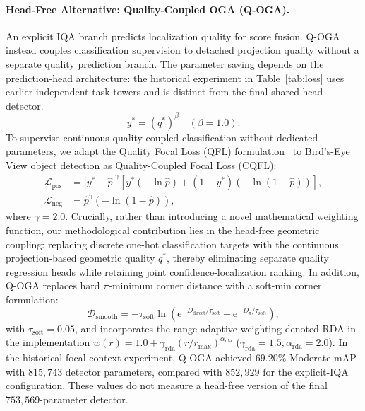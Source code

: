 \paragraph{Head-Free Alternative: Quality-Coupled OGA (Q-OGA).}
An explicit IQA branch predicts localization quality for score fusion. Q-OGA instead couples classification supervision to detached projection quality without a separate quality prediction branch. The parameter saving depends on the prediction-head architecture: the historical experiment in Table~\ref{tab:loss} uses earlier independent task towers and is distinct from the final shared-head detector.
\begin{equation}
    y^* = (q^*)^\beta \quad (\beta = 1.0).
    \label{eq:cqfl_target}
\end{equation}
To supervise continuous quality-coupled classification without dedicated parameters, we adapt the Quality Focal Loss (QFL) formulation~\cite{li2020gfl} to Bird's-Eye View object detection as Quality-Coupled Focal Loss (CQFL):
\begin{align}
    \mathcal{L}_{\mathrm{pos}} &= |y^* - \hat{p}|^\gamma \left[ y^* (-\ln \hat{p}) + (1 - y^*) (-\ln(1 - \hat{p})) \right], \nonumber\\
    \mathcal{L}_{\mathrm{neg}} &= \hat{p}^\gamma (-\ln(1 - \hat{p})),
    \label{eq:cqfl_loss}
\end{align}
where $\gamma = 2.0$. Crucially, rather than introducing a novel mathematical weighting function, our methodological contribution lies in the head-free geometric coupling: replacing discrete one-hot classification targets with the continuous projection-based geometric quality $q^*$, thereby eliminating separate quality regression heads while retaining joint confidence-localization ranking. In addition, Q-OGA replaces hard $\pi$-minimum corner distance with a soft-min corner formulation:
\begin{equation}
    \mathcal{D}_{\mathrm{smooth}} = -\tau_{\mathrm{soft}} \ln\left( \mathrm{e}^{-D_{\mathrm{direct}}/\tau_{\mathrm{soft}}} + \mathrm{e}^{-D_\pi/\tau_{\mathrm{soft}}} \right),
    \label{eq:softmin_corner}
\end{equation}
with $\tau_{\mathrm{soft}} = 0.05$, and incorporates the range-adaptive weighting denoted RDA in the implementation $w(r) = 1.0 + \gamma_{\mathrm{rda}}(r / r_{\max})^{\alpha_{\mathrm{rda}}}$ ($\gamma_{\mathrm{rda}} = 1.5, \alpha_{\mathrm{rda}} = 2.0$). In the historical focal-context experiment, Q-OGA achieved $69.20\%$ Moderate mAP with $815{,}743$ detector parameters, compared with $852{,}929$ for the explicit-IQA configuration. These values do not measure a head-free version of the final $753{,}569$-parameter detector.

